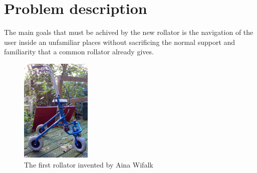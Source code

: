 \chapter{Problem description}

The main goals that must be achived by the new rollator is the navigation of the
user inside an unfamiliar places without sacrificing the normal support and
familiarity that a common rollator already gives.
\begin{figure}[hbt]
    \vspace{0.5cm}
    \centering
    \includegraphics[width=0.3\textwidth]{img/rollator-old}
    \caption{The first rollator invented by Aina Wifalk \cite{imgrollator}}
\end{figure}











  
